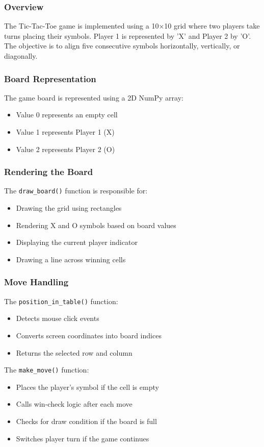 \documentclass[12pt,letterpaper]{article}
\begin{document}
\subsubsection{Overview}
The Tic-Tac-Toe game is implemented using a 10×10 grid where two players take turns placing their symbols. Player 1 is represented by 'X' and Player 2 by 'O'. The objective is to align five consecutive symbols horizontally, vertically, or diagonally.
\subsubsection{Board Representation}
The game board is represented using a 2D NumPy array:
\begin{itemize}
\item Value 0 represents an empty cell
\item Value 1 represents Player 1 (X)
\item Value 2 represents Player 2 (O)
\end{itemize}
\subsubsection{Rendering the Board}
The \texttt{draw\_board()} function is responsible for:
\begin{itemize}
\item Drawing the grid using rectangles
\item Rendering X and O symbols based on board values
\item Displaying the current player indicator
\item Drawing a line across winning cells
\end{itemize}
\subsubsection{Move Handling}
The \texttt{position\_in\_table()} function:
\begin{itemize}
\item Detects mouse click events
\item Converts screen coordinates into board indices
\item Returns the selected row and column
\end{itemize}
The \texttt{make\_move()} function:
\begin{itemize}
\item Places the player's symbol if the cell is empty
\item Calls win-check logic after each move
\item Checks for draw condition if the board is full
\item Switches player turn if the game continues
\end{itemize}
\end{document}
